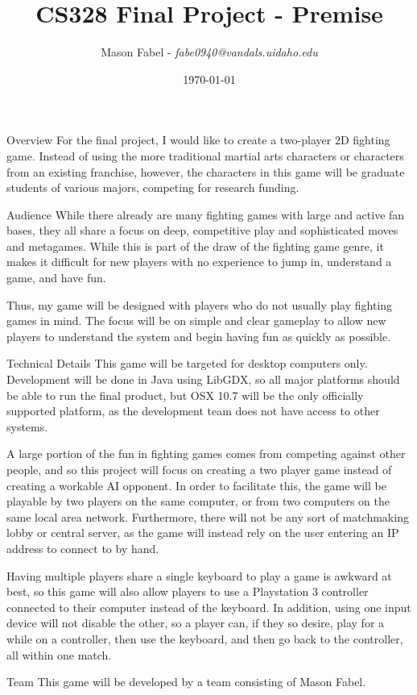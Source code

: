 \documentclass[11pt]{article}
\title{CS328 Final Project - Premise}
\date{\today}
\author{Mason Fabel - \textit{fabe0940@vandals.uidaho.edu}}
\begin{document}
\maketitle

\begin{section}{Overview}
For the final project, I would like to create a two-player 2D fighting game.
Instead of using the more traditional martial arts characters or characters from
an existing franchise, however, the characters in this game will be graduate
students of various majors, competing for research funding.
\end{section}

\begin{section}{Audience}
While there already are many fighting games with large and active fan bases, they
all share a focus on deep, competitive play and sophisticated moves and
metagames. While this is part of the draw of the fighting game genre, it makes
it difficult for new players with no experience to jump in, understand a game,
and have fun.

Thus, my game will be designed with players who do not usually play fighting
games in mind. The focus will be on simple and clear gameplay to allow new
players to understand the system and begin having fun as quickly as possible.
\end{section}

\begin{section}{Technical Details}
This game will be targeted for desktop computers only. Development will be done
in Java using LibGDX, so all major platforms should be able to run the final
product, but OSX 10.7 will be the only officially supported platform, as the
development team does not have access to other systems.

A large portion of the fun in fighting games comes from competing against other
people, and so this project will focus on creating a two player game instead
of creating a workable AI opponent. In order to facilitate this, the game will
be playable by two players on the same computer, or from two computers on the
same local area network. Furthermore, there will not be any sort of matchmaking
lobby or central server, as the game will instead rely on the user entering an
IP address to connect to by hand.

Having multiple players share a single keyboard to play a game is awkward at
best, so this game will also allow players to use a Playstation 3 controller
connected to their computer instead of the keyboard. In addition, using one
input device will not disable the other, so a player can, if they so desire,
play for a while on a controller, then use the keyboard, and then go back to
the controller, all within one match.
\end{section}

\begin{section}{Team}
This game will be developed by a team consisting of Mason Fabel.
\end{section}
\end{document}
